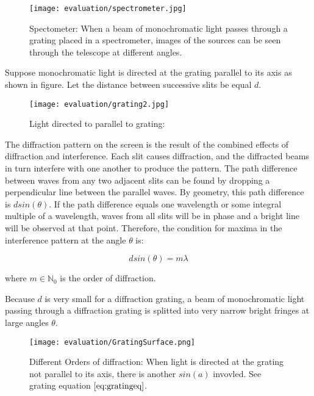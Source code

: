 \begin{figure}[H]
  \centering
  \texttt{[image: evaluation/spectrometer.jpg]}
  \label{fig:spectometer}
  \caption{Spectometer: When a beam of monochromatic light passes through a grating placed in a spectrometer, images of the sources can be seen through the telescope at different angles.}
\end{figure}

Suppose monochromatic light is directed at the grating parallel to its axis as shown in figure. Let the distance between successive slits be equal $d$.

\begin{figure}[H]
  \centering
  \texttt{[image: evaluation/grating2.jpg]}
  \label{fig:lighthitsgrating}
  \caption{Light directed to parallel to grating:}
\end{figure}

The diffraction pattern on the screen is the result of the combined effects of diffraction and interference. Each slit causes diffraction, and the diffracted beams in turn interfere with one another to produce the pattern. The path difference between waves from any two adjacent slits can be found by dropping a perpendicular line between the parallel waves. By geometry, this path difference is $d sin(\theta)$. If the path difference equals one wavelength or some integral multiple of a wavelength, waves from all slits will be in phase and a bright line will be observed at that point. Therefore, the condition for maxima in the interference pattern at the angle $\theta$ is: 

\begin{equation}
 d sin(\theta) = m \lambda 
\label{eq:simplegratingequation}
\end{equation}

where $m \in \mathds{N}_0$ is the order of diffraction.

Because $d$ is very small for a diffraction grating, a beam of monochromatic light passing through a diffraction grating is splitted into very narrow bright fringes at large angles $\theta$.

\begin{figure}[H]
  \centering
  \texttt{[image: evaluation/GratingSurface.png]}
  \caption{Different Orders of diffraction: When light is directed at the grating not parallel to its axis, there is another $sin(a)$ invovled. See grating equation $\ref{eq:gratingeq}$.}
\label{fig:gratingdiffractionorders}
\end{figure}


